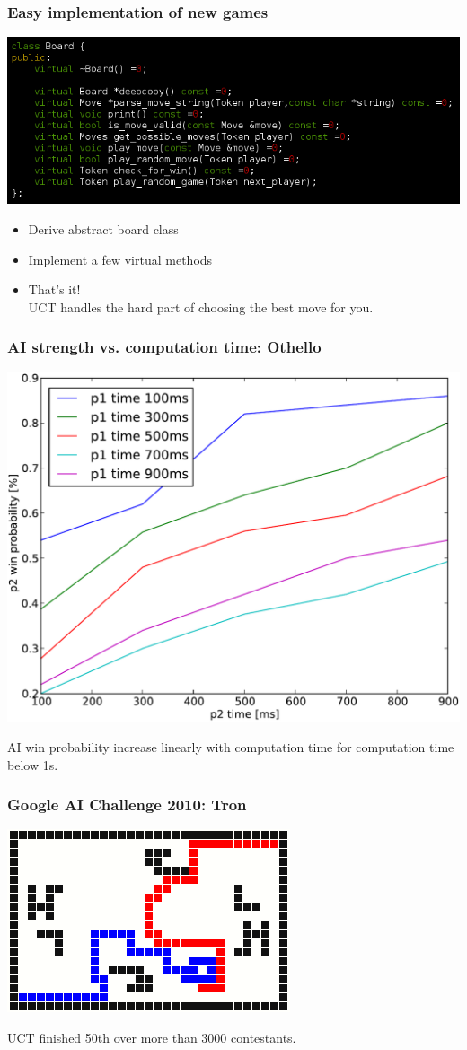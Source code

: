 \documentclass{beamer}
\begin{document}
\begin{frame}
\frametitle{Easy implementation of new games}
\begin{center}
\includegraphics[width=\linewidth]{board_virtual}
\end{center}
\begin{itemize}
\item Derive abstract board class
\item Implement a few virtual methods
\item That's it! \\ UCT handles the hard part of choosing the best move for you.
\end{itemize}
\end{frame}

\begin{frame}
\frametitle{AI strength vs. computation time: Othello}
\begin{center}
\includegraphics[width=.6\linewidth]{perf_othello}
\end{center}
AI win probability increase linearly with computation time for computation time below 1s.
\end{frame}

\begin{frame}
\frametitle{Google AI Challenge 2010: Tron}
\begin{center}
\includegraphics[width=.7\linewidth]{tron} \\
\end{center}
UCT finished 50th over more than 3000 contestants.
\end{frame}
\end{document}
